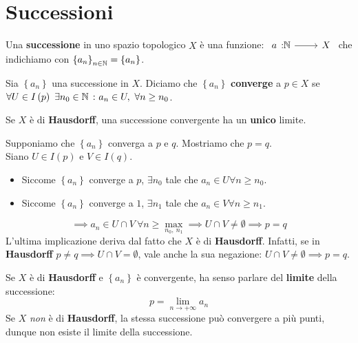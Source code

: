 \section{Successioni}
\begin{define}
Una \textbf{successione} in uno spazio topologico $X$ è una funzione:
$\funz{a}{\naturalset}{X}$ che indichiamo con $\left\{a_n\right\}_{n\in\mathbb{N}}=\left\{a_n\right\}$.
\end{define}
\begin{define}
Sia $\left\{a_n\right\}$ una successione in $X$. Diciamo che $\left\{a_n\right\}$ \textbf{converge} a $p\in X$ se $\forall U\in I\left(p\right)\ \exists n_0\in \mathbb{N}\ \colon a_n\in U,\ \forall n\geq n_0$.
\end{define}
\begin{observe}
	Se $X$ è di \textbf{Hausdorff}, una successione convergente ha un \textbf{unico} limite.
\end{observe}
\begin{demonstration}
	Supponiamo che $\left\{a_n\right\}$ converga a $p$ e $q$. Mostriamo che $p=q$.\\
	Siano $U\in I\left(p\right)$ e $V\in I\left(q\right)$.
	\begin{itemize}
		\item Siccome $\left\{a_n\right\}$ converge a $p$, $\exists n_0$ tale che $a_n\in U \forall n\geq n_0$.
		\item Siccome $\left\{a_n\right\}$ converge a $1$, $\exists n_1$ tale che $a_n\in V \forall n\geq n_1$.
	\end{itemize}
\begin{equation*}
\implies a_n\in U\cap V\ \forall n\geq \max_{n_0,\ n_1}\implies U\cap V\neq \emptyset\implies p=q
\end{equation*}
L'ultima implicazione deriva dal fatto che $X$ è di \textbf{Hausdorff}. Infatti, se in \textbf{Hausdorff} $p\neq q\implies U\cap V = \emptyset$, vale anche la sua negazione: $U\cap V\neq \emptyset\implies p = q$.
\end{demonstration}
\begin{define}
Se $X$ è di \textbf{Hausdorff} e $\left\{a_n\right\}$ è convergente, ha senso parlare del \textbf{limite} della successione:
\begin{equation}
p=\lim_{n \to +\infty}a_n
\end{equation}
Se $X$ \textit{non} è di \textbf{Hausdorff}, la stessa successione può convergere a più punti, dunque non esiste il limite della successione.
\end{define}
